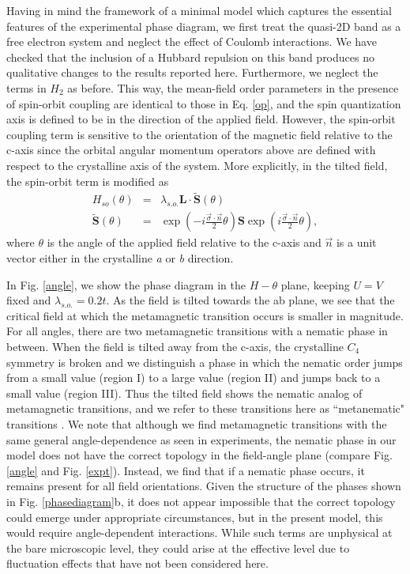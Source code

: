 \documentclass[prb,aps,amssymb,showpacs,twocolumn,amsmath,floatfix]{revtex4}
\begin{document}
Having in mind the framework of a minimal model which captures the essential features 
of the experimental phase diagram, we first treat the quasi-2D band as a free electron system and neglect 
the effect of Coulomb interactions.  We have checked that the inclusion of a Hubbard repulsion on this 
band produces no qualitative changes to the results reported here.  Furthermore, we neglect the terms in $H_2$ as before.  
This way, the mean-field order parameters in the presence of spin-orbit coupling are identical 
to those in Eq. \ref{op}, and the spin quantization axis is defined to be in the direction of the applied field.
However, the spin-orbit coupling term is sensitive to the orientation of the magnetic field relative to the c-axis since 
the orbital angular momentum operators above are defined with respect to the crystalline axis of the system.  
More explicitly, in the tilted field, the spin-orbit term is modified as 
\begin{eqnarray}
H_{so}(\theta) &=& \lambda_{s.o.} \bm L \cdot \tilde{\bm S}(\theta) \nonumber \\ 
\tilde{ \bm S}(\theta) &=& \exp{ \left(-i \frac{\vec{\sigma} \cdot \vec{n} }{2} \theta \right) } \bm S 
\exp{ \left(i \frac{\vec{\sigma} \cdot \vec{n} }{2} \theta \right) },
\end{eqnarray}
where $\theta $ is the angle of the applied field relative to the c-axis and $\vec{n}$ is a
 unit vector either in the crystalline {\it a} or {\it b} direction.    


 
  
In Fig. \ref{angle}, we show the 
phase diagram in the $H-\theta$ plane, keeping $U=V$ fixed and $\lambda_{s.o.} = 0.2t$.    As 
the field is tilted towards the ab plane, we see that the critical field at which the metamagnetic transition 
occurs is smaller in magnitude.  For all angles, there are two metamagnetic transitions with a nematic 
phase in between.  When the field is tilted away from the c-axis, the crystalline $C_4$ symmetry is 
broken and we distinguish a phase in which the nematic order jumps from a small value (region I) 
to a large value (region II) and jumps back to a small value (region III).  Thus the tilted field 
shows the nematic analog of metamagnetic transitions, and we refer to these transitions here as 
``metanematic" transitions \cite{Puetter2007}.  We note that although we find metamagnetic transitions with the 
same general angle-dependence as seen in experiments, the nematic phase in our model 
does not have the correct topology in the field-angle plane (compare Fig. \ref{angle} and Fig. \ref{expt}).  
Instead, we find that if a nematic phase occurs, it remains present for 
all field orientations.  
Given the structure of the phases shown in Fig. \ref{phasediagram}b, it does not appear 
impossible that the correct topology could emerge under appropriate circumstances, but in the present 
model, this would require
angle-dependent interactions.  While such terms are unphysical at the bare microscopic level, they could arise at the effective level due to fluctuation effects 
that have not been considered here.  
\end{document}
